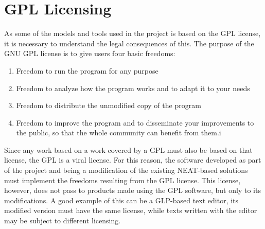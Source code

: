 \section{GPL Licensing}
As some of the models and tools used in the project is based on the GPL license, it is necessary 
to understand the legal consequences of this. 
The purpose of the GNU GPL license is to give users four basic freedoms: 
\begin{enumerate}
\item Freedom to run the program for any purpose 
\item Freedom to analyze how the program works and to adapt it to your needs 
\item Freedom to distribute the unmodified copy of the program 
\item Freedom to improve the program and to disseminate your improvements to the public, so that 
	the whole community can benefit from them.i
\end{enumerate}
Since any work based on a work covered by a GPL must also be based on that license, the GPL 
is a viral license. 
For this reason, the software developed as part of the project and being a modification of the 
existing NEAT-based solutions must implement the freedoms resulting from the GPL license. 
This license, however, does not pass to products made using the GPL software, but only to its 
modifications. 
A good example of this can be a GLP-based text editor, its modified version must have the same 
license, while texts written with the editor may be subject to different licensing.
